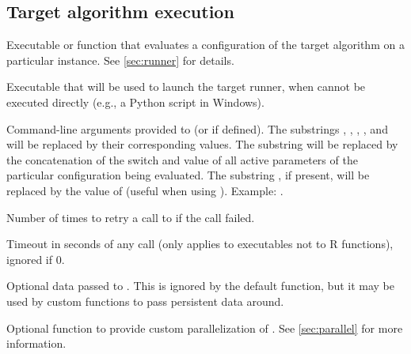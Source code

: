 \subsection[Target algorithm execution]{Target algorithm execution}
\begin{description}
Executable or \aR function that evaluates a configuration of the target algorithm on a particular instance. See \autoref{sec:runner} for details.

Executable that will be used to launch the target runner, when  cannot be executed directly (e.g., a Python script in Windows).

Command-line arguments provided to  (or  if defined). The substrings , ,  ,  , and  will be replaced by their corresponding values. The substring  will be replaced by the concatenation of the switch and value of all active parameters of the particular configuration being evaluated.  The substring , if present, will be replaced by the value of  (useful when using ).  Example:
.

Number of times to retry a call to  if the call failed.

Timeout in seconds of any  call (only applies to  executables not to R functions), ignored if 0.

Optional data passed to . This is ignored by the default  function, but it may be used by custom  functions to pass persistent data around.

 Optional \aR function to provide custom parallelization of . See \autoref{sec:parallel} for more information.


\end{description}
